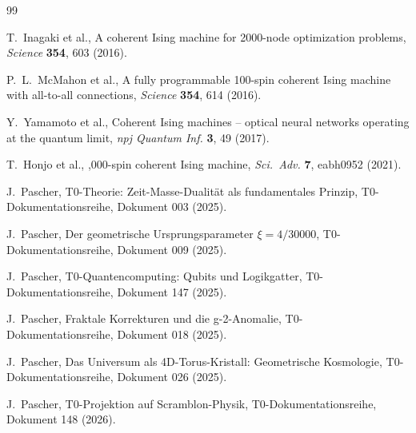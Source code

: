 \begin{thebibliography}{99}

T.~Inagaki et al.,
\newblock A coherent Ising machine for 2000-node optimization problems,
\newblock \emph{Science} \textbf{354}, 603 (2016).

P.~L.~McMahon et al.,
\newblock A fully programmable 100-spin coherent Ising machine with all-to-all connections,
\newblock \emph{Science} \textbf{354}, 614 (2016).

Y.~Yamamoto et al.,
\newblock Coherent Ising machines -- optical neural networks operating at the quantum limit,
\newblock \emph{npj Quantum Inf.} \textbf{3}, 49 (2017).

T.~Honjo et al.,
,000-spin coherent Ising machine,
\newblock \emph{Sci.\ Adv.} \textbf{7}, eabh0952 (2021).

J.~Pascher,
\newblock T0-Theorie: Zeit-Masse-Dualität als fundamentales Prinzip,
\newblock T0-Dokumentationsreihe, Dokument 003 (2025).

J.~Pascher,
\newblock Der geometrische Ursprungsparameter $\xi = 4/30000$,
\newblock T0-Dokumentationsreihe, Dokument 009 (2025).

J.~Pascher,
\newblock T0-Quantencomputing: Qubits und Logikgatter,
\newblock T0-Dokumentationsreihe, Dokument 147 (2025).

J.~Pascher,
\newblock Fraktale Korrekturen und die g-2-Anomalie,
\newblock T0-Dokumentationsreihe, Dokument 018 (2025).

J.~Pascher,
\newblock Das Universum als 4D-Torus-Kristall: Geometrische Kosmologie,
\newblock T0-Dokumentationsreihe, Dokument 026 (2025).

J.~Pascher,
\newblock T0-Projektion auf Scramblon-Physik,
\newblock T0-Dokumentationsreihe, Dokument 148 (2026).

\end{thebibliography}
